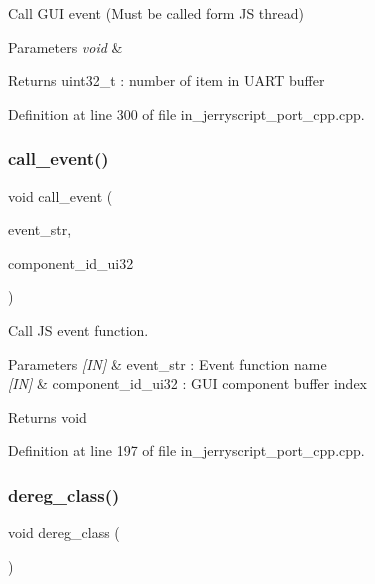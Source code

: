 Call G\+UI event (Must be called form JS thread) 


\begin{DoxyParams}{Parameters}
{\em void} & \\
\hline
\end{DoxyParams}
\begin{DoxyReturn}{Returns}
uint32\+\_\+t \+: number of item in U\+A\+RT buffer 
\end{DoxyReturn}


Definition at line 300 of file in\+\_\+jerryscript\+\_\+port\+\_\+cpp.\+cpp.

\mbox{\label{group___port_ga66c5eaf23bd946414ba9e21faad798a5}} 
\subsubsection{call\_event()}
{\footnotesize\ttfamily void call\+\_\+event (\begin{DoxyParamCaption}\item[{wx\+String}]{event\+\_\+str,  }\item[{uint32\+\_\+t}]{component\+\_\+id\+\_\+ui32 }\end{DoxyParamCaption})}



Call JS event function. 


\begin{DoxyParams}{Parameters}
{\em \mbox{[}\+I\+N\mbox{]}} & event\+\_\+str \+: Event function name \\
\hline
{\em \mbox{[}\+I\+N\mbox{]}} & component\+\_\+id\+\_\+ui32 \+: G\+UI component buffer index \\
\hline
\end{DoxyParams}
\begin{DoxyReturn}{Returns}
void 
\end{DoxyReturn}


Definition at line 197 of file in\+\_\+jerryscript\+\_\+port\+\_\+cpp.\+cpp.

\mbox{\label{group___port_ga028c4a3d2af780017a3fb63a77e05adc}} 
\subsubsection{dereg\_class()}
{\footnotesize\ttfamily void dereg\+\_\+class (\begin{DoxyParamCaption}\item[{void}]{ }\end{DoxyParamCaption})}



